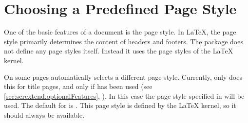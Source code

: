 
\section{Choosing a Predefined Page Style}

One of the basic features of a document is the page
style. In \LaTeX{}, the page style primarily
determines the content of headers and footers. The  package
does not define any page styles itself. Instead it uses the page styles of the
\LaTeX{} kernel.


\begin{Declaration}
\end{Declaration}%
%
On some pages 
automatically selects a different page style. Currently, 
only does this for title pages, and only if
 has been used (see
\autoref{sec:scrextend.optionalFeatures},
). In this case the page style
specified in  will be used. The default for
 is
. This page style is defined by the
\LaTeX{} kernel, so it should always be available.%
\EndIndexGroup





%
\EndIndexGroup

\endinput

